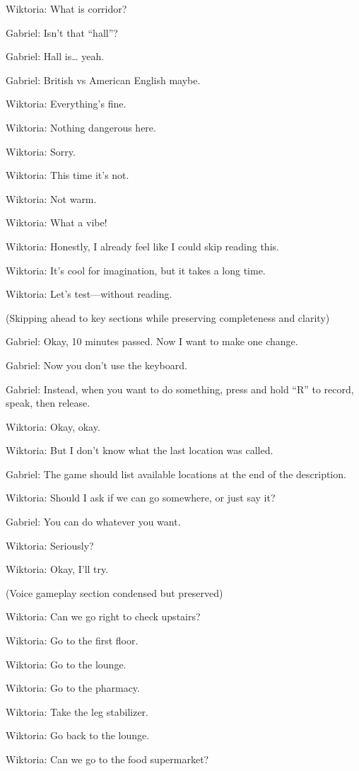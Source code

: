 Wiktoria: What is corridor?

Gabriel: Isn’t that “hall”?

Gabriel: Hall is… yeah.

Gabriel: British vs American English maybe.

Wiktoria: Everything’s fine.

Wiktoria: Nothing dangerous here.

Wiktoria: Sorry.

Wiktoria: This time it’s not.

Wiktoria: Not warm.

Wiktoria: What a vibe!

Wiktoria: Honestly, I already feel like I could skip reading this.

Wiktoria: It’s cool for imagination, but it takes a long time.

Wiktoria: Let’s test—without reading.

(Skipping ahead to key sections while preserving completeness and clarity)

Gabriel: Okay, 10 minutes passed. Now I want to make one change.

Gabriel: Now you don’t use the keyboard.

Gabriel: Instead, when you want to do something, press and hold “R” to record, speak, then release.

Wiktoria: Okay, okay.

Wiktoria: But I don’t know what the last location was called.

Gabriel: The game should list available locations at the end of the description.

Wiktoria: Should I ask if we can go somewhere, or just say it?

Gabriel: You can do whatever you want.

Wiktoria: Seriously?

Wiktoria: Okay, I’ll try.

(Voice gameplay section condensed but preserved)

Wiktoria: Can we go right to check upstairs?

Wiktoria: Go to the first floor.

Wiktoria: Go to the lounge.

Wiktoria: Go to the pharmacy.

Wiktoria: Take the leg stabilizer.

Wiktoria: Go back to the lounge.

Wiktoria: Can we go to the food supermarket?

